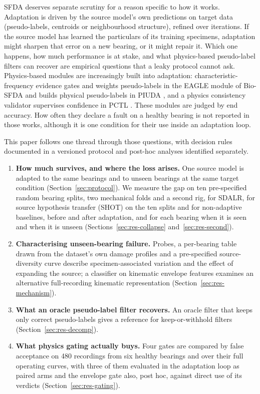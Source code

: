 SFDA deserves separate scrutiny for a reason specific to how it works. Adaptation is driven by the source model's own
predictions on target data (pseudo-labels, centroids or neighbourhood structure), refined over iterations. If the
source model has learned the particulars of its training specimens, adaptation might sharpen that error on a new bearing,
or it might repair it. Which one happens, how much performance is at stake, and what physics-based pseudo-label filters can
recover are empirical questions that a leaky protocol cannot ask. Physics-based modules are increasingly built into adaptation:
characteristic-frequency evidence gates and weights pseudo-labels in the EAGLE module of Bio-SFDA \cite{yoon2026biosfda}
and builds physical pseudo-labels in PIUDA \cite{jia2024piuda}, and a physics consistency validator supervises confidence
in PCTL \cite{pctl2026}. These modules are judged by end accuracy. How often they declare a fault on a healthy bearing is not
reported in those works, although it is one condition for their use inside an adaptation loop.

This paper follows one thread through those questions, with decision rules documented in a versioned protocol and post-hoc analyses identified separately.

\begin{enumerate}
  \item \textbf{How much survives, and where the loss arises.} One source model is adapted to the same bearings and to
        unseen bearings at the same target condition (Section~\ref{sec:protocol}). We measure the gap on ten
        pre-specified random bearing splits, two mechanical folds and a second rig, for SDALR, for source hypothesis
        transfer (SHOT) \cite{liang2020shot} on the ten splits and for non-adaptive baselines, before and after adaptation, and for each bearing when it is seen and when it is unseen
        (Sections~\ref{sec:res-collapse} and~\ref{sec:res-second}).
  \item \textbf{Characterising unseen-bearing failure.} Probes, a per-bearing table drawn from the dataset's own damage profiles and a
        pre-specified source-diversity curve describe specimen-associated variation and the effect of expanding the source;
        a classifier on kinematic envelope features examines an alternative full-recording kinematic representation
        (Section~\ref{sec:res-mechanism}).
  \item \textbf{What an oracle pseudo-label filter recovers.} An oracle filter that keeps only correct pseudo-labels gives a
        reference for keep-or-withhold filters (Section~\ref{sec:res-decomp}).
  \item \textbf{What physics gating actually buys.} Four gates are compared by false acceptance on 480 recordings from six healthy bearings and over their full operating curves, with three of them evaluated in the adaptation loop as paired arms and the envelope gate also, post hoc, against direct use of its verdicts
        (Section~\ref{sec:res-gating}).
\end{enumerate}

